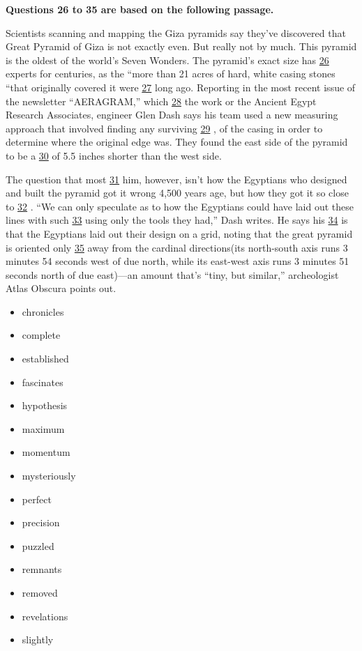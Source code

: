 \documentclass[UTF8,11pt]{ctexart}
\begin{document}
\textbf{Questions 26 to 35 are based on the following passage.}


Scientists scanning and mapping the Giza pyramids say they’ve discovered that Great Pyramid of Giza is not exactly even. But really not by much. This pyramid is the oldest of the world’s Seven Wonders. The pyramid’s exact size has \uline{26} experts for centuries, as the “more than 21 acres of hard, white casing stones “that originally covered it were \uline{27} long ago. Reporting in the most recent issue of the newsletter “AERAGRAM,” which \uline{28} the work or the Ancient Egypt Research Associates, engineer Glen Dash says his team used a new measuring approach that involved finding any surviving \uline{29} , of the casing in order to determine where the original edge was. They found the east side of the pyramid to be a \uline{30} of 5.5 inches shorter than the west side.


The question that most \uline{31} him, however, isn’t how the Egyptians who designed and built the pyramid got it wrong 4,500 years age, but how they got it so close to \uline{32} . “We can only speculate as to how the Egyptians could have laid out these lines with such \uline{33} using only the tools they had,” Dash writes. He says his \uline{34} is that the Egyptians laid out their design on a grid, noting that the great pyramid is oriented only \uline{35} away from the cardinal directions(its north-south axis runs 3 minutes 54 seconds west of due north, while its east-west axis runs 3 minutes 51 seconds north of due east)—an amount that’s “tiny, but similar,” archeologist Atlas Obscura points out.


\begin{itemize}[leftmargin=2em,itemsep=.2em,topsep=.4em]\item[A.] chronicles
\item[B.] complete
\item[C.] established
\item[D.] fascinates
\item[E.] hypothesis
\item[F.] maximum
\item[G.] momentum
\item[H.] mysteriously
\item[I.] perfect
\item[J.] precision
\item[K.] puzzled
\item[L.] remnants
\item[M.] removed
\item[N.] revelations
\item[O.] slightly
\end{itemize}
\end{document}
